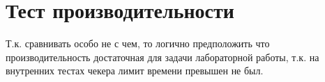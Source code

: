 \section{Тест производительности}
Т.к. сравнивать особо не с чем, то логично предположить что производительность достаточная для задачи лабораторной работы, т.к. на внутренних тестах чекера лимит времени превышен не был.
\pagebreak

